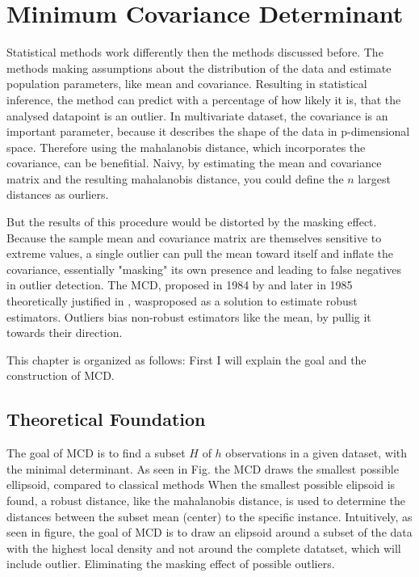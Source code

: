 \section*{Minimum Covariance Determinant}
Statistical methods work differently then the methods discussed before. 
The methods making assumptions about the distribution of the data and  estimate population parameters, like mean and covariance.
Resulting in statistical inference, the method can predict with a percentage of how likely it is, that the analysed datapoint is an outlier.
In multivariate dataset, the covariance is an important parameter, because it describes the shape of the data in p-dimensional space.
Therefore using the mahalanobis distance, which incorporates the covariance, can be benefitial.
Naivy, by estimating the mean and covariance matrix and the resulting mahalanobis distance, you could define the $n$ largest distances as ourliers.


But the results of this procedure would be distorted by the masking effect.
Because the sample mean and covariance matrix are themselves sensitive to extreme values, a single outlier can pull the mean toward itself and inflate the covariance, essentially "masking" its own presence and leading to false negatives in outlier detection.
The MCD, proposed in 1984 by \citet{rousseeuw1984least} and later in 1985 theoretically justified in \citet{rousseeuw1985multivariate}, wasproposed as a solution to estimate robust estimators. 
Outliers bias non-robust estimators like the mean, by pullig it towards their direction.


This chapter is organized as follows: First I will explain the goal and the construction of MCD.


\subsection*{Theoretical Foundation}
The goal of MCD is to find a subset $H$ of $h$  observations in a given dataset, with the minimal determinant.
As seen in Fig. the MCD draws the smallest possible ellipsoid, compared to classical methods 
When the smallest possible elipsoid is found, a robust distance, like the mahalanobis distance, is used to determine the distances between the subset mean (center) to the specific instance.
Intuitively,  as seen in figure, the goal of MCD is to draw an elipsoid around a subset of the data with the highest local density and not around the complete datatset, which will include outlier. 
Eliminating the masking effect of possible outliers.


